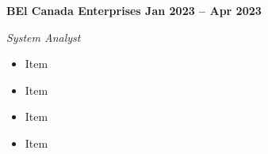 \vspace{0.1cm}
\textbf{BEl Canada Enterprises \hfill Jan 2023 -- Apr 2023} \par
\textit{System Analyst} \par
\begin{itemize}
	\item Item
  \item Item
  \item Item
  \item Item
\end{itemize} \par